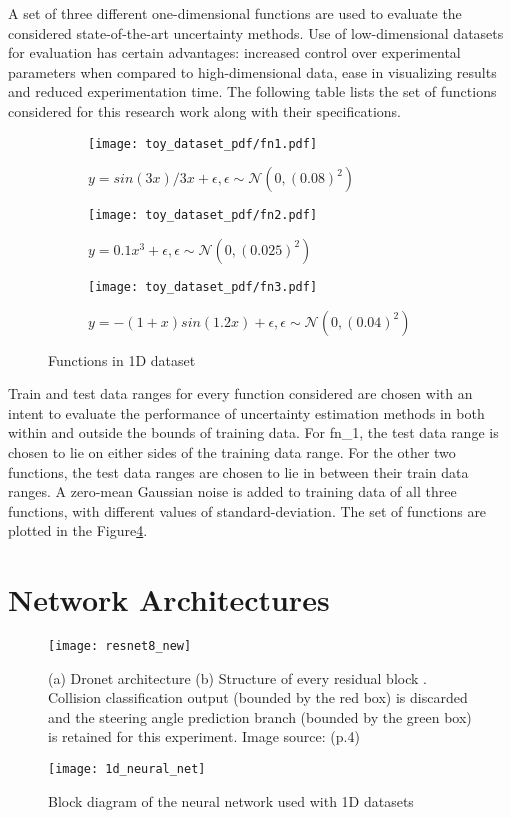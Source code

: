 A set of three different one-dimensional functions are used to evaluate the considered state-of-the-art uncertainty methods. Use of low-dimensional datasets for evaluation has certain advantages: increased control over experimental parameters when compared to high-dimensional data, ease in visualizing results and reduced experimentation time. The following table lists the set of functions considered for this research work along with their specifications.
\begin{figure}[H]
	\centering
	\begin{subfigure}[b]{0.45\textwidth}
		\centering
		\texttt{[image: toy\_dataset\_pdf/fn1.pdf]}
		\caption{$y=sin(3x)/3x+\epsilon, \epsilon \sim \mathcal{N}(0,(0.08)^2)$}
		\label{fig:y equals x}
	\end{subfigure}
	\hfill
	\begin{subfigure}[b]{0.45\textwidth}
		\centering
		\texttt{[image: toy\_dataset\_pdf/fn2.pdf]}
		\caption{$y=0.1x^3+\epsilon, \epsilon \sim \mathcal{N}(0,(0.025)^2)$}
		\label{fig:three sin x}
	\end{subfigure}
	\hfill
	\begin{subfigure}[b]{0.45\textwidth}
		\centering
		\texttt{[image: toy\_dataset\_pdf/fn3.pdf]}
		\caption{$y=-(1+x)sin(1.2x)+\epsilon, \epsilon \sim \mathcal{N}(0,(0.04)^2)$}
		\label{fig:five over x}
	\end{subfigure}
	\caption{Functions in 1D dataset}
	\label{fig_1d_dataset}
\end{figure}
Train and test data ranges for every function considered are chosen with an intent to evaluate the performance of uncertainty estimation methods in both within and outside the bounds of training data. For fn\_1, the test data range is chosen to lie on either sides of the training data range. For the other two functions, the test data ranges are chosen to lie in between their train data ranges. A zero-mean Gaussian noise is added to training data of all three functions, with different values of standard-deviation. The set of functions are plotted in the Figure\ref{fig_1d_dataset}. 
\section{Network Architectures}
\begin{figure}[H]
	\texttt{[image: resnet8\_new]}
	\caption[Dronet architecture]{(a) Dronet architecture (b) Structure of every residual block . Collision classification output (bounded by the red box) is discarded and the steering angle prediction branch (bounded by the green box) is retained for this experiment.  Image source: \cite{loquercio2018dronet} (p.4)}
	\label{fig_resnet8}
\end{figure}
\begin{figure}[H]
	\centering
	\texttt{[image: 1d\_neural\_net]}
	\caption{Block diagram of the neural network used with 1D datasets}
	\label{fig_1dnet}
\end{figure}
